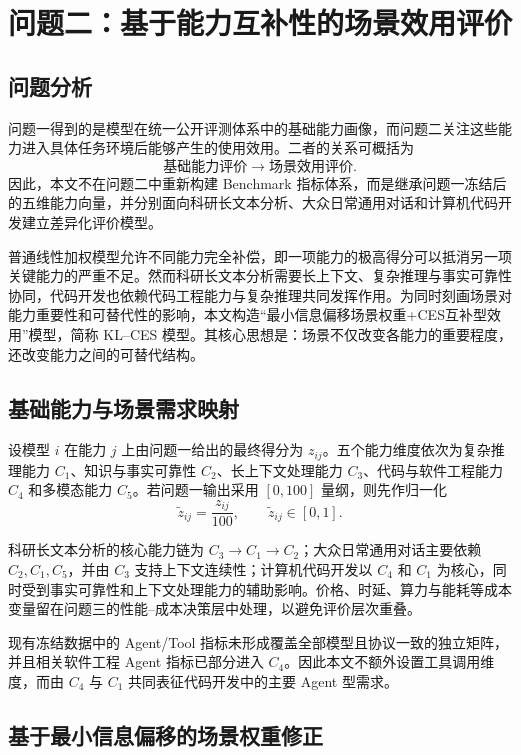 \section{问题二：基于能力互补性的场景效用评价}

\subsection{问题分析}

问题一得到的是模型在统一公开评测体系中的基础能力画像，而问题二关注这些能力进入具体任务环境后能够产生的使用效用。二者的关系可概括为
\[
\text{基础能力评价}\longrightarrow\text{场景效用评价}.
\]
因此，本文不在问题二中重新构建 Benchmark 指标体系，而是继承问题一冻结后的五维能力向量，并分别面向科研长文本分析、大众日常通用对话和计算机代码开发建立差异化评价模型。

普通线性加权模型允许不同能力完全补偿，即一项能力的极高得分可以抵消另一项关键能力的严重不足。然而科研长文本分析需要长上下文、复杂推理与事实可靠性协同，代码开发也依赖代码工程能力与复杂推理共同发挥作用。为同时刻画场景对能力重要性和可替代性的影响，本文构造“最小信息偏移场景权重+CES互补型效用”模型，简称 KL--CES 模型。其核心思想是：场景不仅改变各能力的重要程度，还改变能力之间的可替代结构。

\subsection{基础能力与场景需求映射}

设模型 $i$ 在能力 $j$ 上由问题一给出的最终得分为 $z_{ij}$。五个能力维度依次为复杂推理能力 $C_1$、知识与事实可靠性 $C_2$、长上下文处理能力 $C_3$、代码与软件工程能力 $C_4$ 和多模态能力 $C_5$。若问题一输出采用 $[0,100]$ 量纲，则先作归一化
\[
\widetilde z_{ij}=\frac{z_{ij}}{100},\qquad \widetilde z_{ij}\in[0,1].
\]

科研长文本分析的核心能力链为 $C_3\rightarrow C_1\rightarrow C_2$；大众日常通用对话主要依赖 $C_2,C_1,C_5$，并由 $C_3$ 支持上下文连续性；计算机代码开发以 $C_4$ 和 $C_1$ 为核心，同时受到事实可靠性和上下文处理能力的辅助影响。价格、时延、算力与能耗等成本变量留在问题三的性能--成本决策层中处理，以避免评价层次重叠。

现有冻结数据中的 Agent/Tool 指标未形成覆盖全部模型且协议一致的独立矩阵，并且相关软件工程 Agent 指标已部分进入 $C_4$。因此本文不额外设置工具调用维度，而由 $C_4$ 与 $C_1$ 共同表征代码开发中的主要 Agent 型需求。

\subsection{基于最小信息偏移的场景权重修正}

